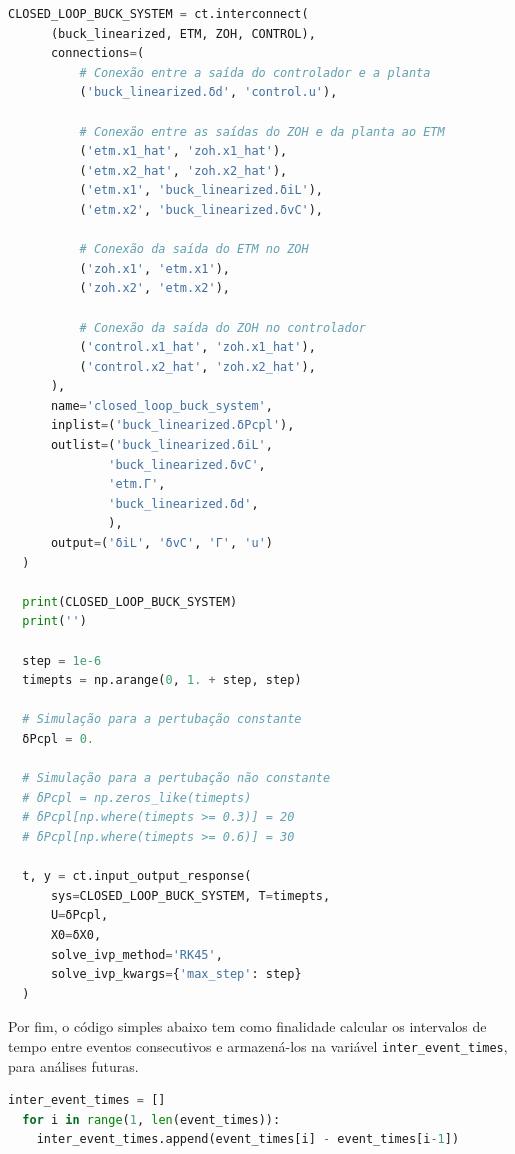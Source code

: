 \vspace{8pt}
\begin{lstlisting}[language=Python, caption={Sistema em loop fechado sob o ETC.}, label=cod:closed_loop]
  CLOSED_LOOP_BUCK_SYSTEM = ct.interconnect(
      (buck_linearized, ETM, ZOH, CONTROL),
      connections=(
          # Conexão entre a saída do controlador e a planta
          ('buck_linearized.δd', 'control.u'),

          # Conexão entre as saídas do ZOH e da planta ao ETM
          ('etm.x1_hat', 'zoh.x1_hat'),
          ('etm.x2_hat', 'zoh.x2_hat'),
          ('etm.x1', 'buck_linearized.δiL'),
          ('etm.x2', 'buck_linearized.δvC'),

          # Conexão da saída do ETM no ZOH
          ('zoh.x1', 'etm.x1'),
          ('zoh.x2', 'etm.x2'),

          # Conexão da saída do ZOH no controlador
          ('control.x1_hat', 'zoh.x1_hat'),
          ('control.x2_hat', 'zoh.x2_hat'),
      ),
      name='closed_loop_buck_system',
      inplist=('buck_linearized.δPcpl'),
      outlist=('buck_linearized.δiL',
              'buck_linearized.δvC',
              'etm.Γ',
              'buck_linearized.δd',
              ),
      output=('δiL', 'δvC', 'Γ', 'u')
  )

  print(CLOSED_LOOP_BUCK_SYSTEM)
  print('')

  step = 1e-6
  timepts = np.arange(0, 1. + step, step)

  # Simulação para a pertubação constante
  δPcpl = 0.

  # Simulação para a pertubação não constante
  # δPcpl = np.zeros_like(timepts)
  # δPcpl[np.where(timepts >= 0.3)] = 20
  # δPcpl[np.where(timepts >= 0.6)] = 30

  t, y = ct.input_output_response(
      sys=CLOSED_LOOP_BUCK_SYSTEM, T=timepts,
      U=δPcpl,
      X0=δX0,
      solve_ivp_method='RK45',
      solve_ivp_kwargs={'max_step': step}
  )
\end{lstlisting}

Por fim, o código simples abaixo tem como finalidade calcular os intervalos de tempo entre eventos consecutivos e armazená-los na variável \texttt{inter\_event\_times}, para análises futuras.

\vspace{8pt}
\begin{lstlisting}[language=Python, caption={Cálculo da intervalo entre eventos.}, label=cod:closed_loop]
  inter_event_times = []
  for i in range(1, len(event_times)):
    inter_event_times.append(event_times[i] - event_times[i-1])
\end{lstlisting}